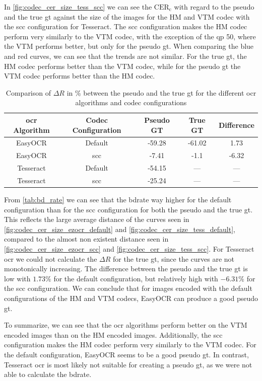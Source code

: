 In \autoref{fig:codec_cer_size_tess_scc} we can see the $\text{CER}_{\text{c}}$ with regard to the pseudo and the true \gls{gt} against the size of the images for the HM and VTM codec with the \gls{scc} configuration for Tesseract.
The \gls{scc} configuration makes the HM codec perform very similarly to the VTM codec, with the exception of the \gls{qp} 50, where the VTM performs better, but only for the pseudo \gls{gt}.
When comparing the blue and red curves, we can see that the trends are not similar.
For the true \gls{gt}, the HM codec performs better than the VTM codec, while for the pseudo \gls{gt} the VTM codec performs better than the HM codec.

\begin{table}[h!]
    \centering
    \begin{tabular}{|cc|cc|c|}
        \hline
        \gls{ocr} Algorithm & Codec Configuration & Pseudo GT & True GT & Difference \\
        \hline
        \hline
        EasyOCR & Default & -59.28 & -61.02 & 1.73 \\
        EasyOCR & \gls{scc} & -7.41 & -1.1 & -6.32 \\
        \hline
        Tesseract & Default & -54.15 & --- & --- \\
        Tesseract & \gls{scc} & -25.24 & --- & --- \\
        \hline
    \end{tabular}
    \caption{Comparison of $\Delta R$ in \% between the pseudo and the true \gls{gt} for the different \gls{ocr} algorithms and codec configurations}
    \label{tab:bd_rate}
\end{table}

From \autoref{tab:bd_rate} we can see that the \gls{bdrate} way higher for the default configuration than for the \gls{scc} configuration for both the pseudo and the true \gls{gt}.
This reflects the large average distance of the curves seen in \autoref{fig:codec_cer_size_ezocr_default} and \autoref{fig:codec_cer_size_tess_default}, compared to the almost non existent distance seen in \autoref{fig:codec_cer_size_ezocr_scc} and \autoref{fig:codec_cer_size_tess_scc}.
For Tesseract \gls{ocr} we could not calculate the $\Delta R$ for the true \gls{gt}, since the curves are not monotonically increasing.
The difference between the pseudo and the true \gls{gt} is low with $1.73\%$ for the default configuration, but relatively high with $-6.31\%$ for the \gls{scc} configuration.
We can conclude that for images encoded with the default configurations of the HM and VTM codecs, EasyOCR can produce a good pseudo \gls{gt}.

To summarize, we can see that the \gls{ocr} algorithms perform better on the VTM encoded images than on the HM encoded images.
Additionally, the \gls{scc} configuration makes the HM codec perform very similarly to the VTM codec.
For the default configuration, EasyOCR seems to be a good pseudo \gls{gt}.
In contrast, Tesseract \gls{ocr} is most likely not suitable for creating a pseudo \gls{gt}, as we were not able to calculate the \gls{bdrate}.
